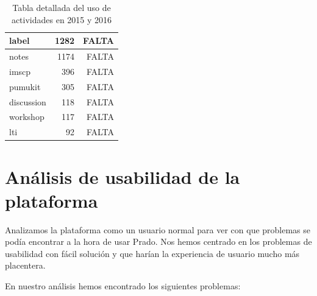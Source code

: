 \begin{table}[H]
\begin{tabular}{|l|r|r|}
label           & 1282          & FALTA         \\ \hline
notes           & 1174          & FALTA         \\ \hline
imscp           & 396           & FALTA         \\ \hline
pumukit         & 305           & FALTA         \\ \hline
discussion      & 118           & FALTA         \\ \hline
workshop        & 117           & FALTA         \\ \hline
lti             & 92            & FALTA         \\ \hline
\end{tabular}
\caption{Tabla detallada del uso de actividades en 2015 y 2016}
\label{table:usoactividades_2015}
\end{table}


\section{Análisis de usabilidad de la plataforma}

Analizamos la plataforma como un usuario normal para ver con que problemas se podía encontrar a la hora de usar Prado. Nos hemos centrado en los problemas de usabilidad con fácil solución y que harían la experiencia de usuario mucho más placentera.

\bigskip
En nuestro análisis hemos encontrado los siguientes problemas:

